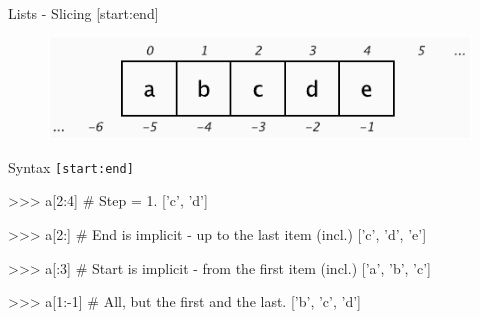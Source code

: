 \documentclass[10pt]{beamer}
\begin{document}
\begin{frame}[fragile]{Lists - Slicing [start:end]}

	\vspace*{-0.1cm}
	\begin{figure}[!h]
		\centering
		\includegraphics[width=0.6\linewidth]{img/slicing.pdf}		
	\end{figure}

	\vspace*{-0.3cm}
	\pause
	Syntax \small{\texttt{[start:end]}}
	
	\pause
	\begin{pythoncode}
		>>> a[2:4]  # Step = 1.
		['c', 'd']
	\end{pythoncode}

	\pause
	\begin{pythoncode}
		>>> a[2:]  # End is implicit - up to the last item (incl.)
		['c', 'd', 'e']
	\end{pythoncode}

	\pause
	\begin{pythoncode}
		>>> a[:3]  # Start is implicit - from the first item (incl.)
		['a', 'b', 'c']
	\end{pythoncode}

	\pause
	\begin{pythoncode}
		>>> a[1:-1]  # All, but the first and the last.
		['b', 'c', 'd']
	\end{pythoncode}		
\end{frame}
\end{document}
